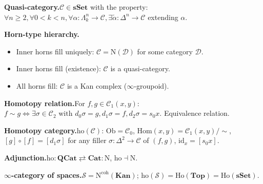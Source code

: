 \begin{formalrestatement}
\textbf{Quasi-category.}\quad $\mathcal{C} \in \mathbf{sSet}$ with the
property: $\forall n \geq 2, \forall 0 < k < n, \forall \alpha :
\Lambda^n_k \to \mathcal{C}, \exists \tilde\alpha : \Delta^n \to
\mathcal{C}$ extending $\alpha$.

\medskip
\textbf{Horn-type hierarchy.}\quad
\begin{itemize}
  \item Inner horns fill uniquely: $\mathcal{C} = \mathrm{N}(\mathcal{D})$
        for some category $\mathcal{D}$.
  \item Inner horns fill (existence): $\mathcal{C}$ is a quasi-category.
  \item All horns fill: $\mathcal{C}$ is a Kan complex ($\infty$-groupoid).
\end{itemize}

\medskip
\textbf{Homotopy relation.}\quad For $f, g \in \mathcal{C}_1(x, y)$:
$f \sim g \iff \exists \sigma \in \mathcal{C}_2 \text{ with } d_0\sigma = g,
d_1\sigma = f, d_2\sigma = s_0 x$. Equivalence relation.

\medskip
\textbf{Homotopy category.}\quad $\mathrm{ho}(\mathcal{C})$:
$\mathrm{Ob} = \mathcal{C}_0$, $\mathrm{Hom}(x, y) = \mathcal{C}_1(x, y) / \sim$,
$[g] \circ [f] = [d_1 \sigma]$ for any filler $\sigma : \Delta^2 \to \mathcal{C}$
of $(f, g)$, $\mathrm{id}_x = [s_0 x]$.

\medskip
\textbf{Adjunction.}\quad $\mathrm{ho} : \mathbf{QCat}
\rightleftarrows \mathbf{Cat} : \mathrm{N}$, $\mathrm{ho} \dashv \mathrm{N}$.

\medskip
\textbf{$\infty$-category of spaces.}\quad $\mathcal{S} =
\mathrm{N}^{\mathrm{coh}}(\mathbf{Kan})$; $\mathrm{ho}(\mathcal{S}) =
\mathrm{Ho}(\mathbf{Top}) = \mathrm{Ho}(\mathbf{sSet})$.
\end{formalrestatement}
